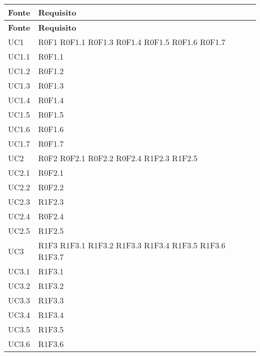 \def\arraystretch{1.5}
\begin{longtable}{p{2.5cm}!{\VRule[1pt]}p{2.5cm}}
\color{white} \textbf{Fonte} & \color{white} \textbf{Requisito} \\ 
\endfirsthead 
{} 
\color{white} \textbf{Fonte} & \color{white} \textbf{Requisito} \\ 
\endhead 
UC1 & R0F1 
	\newline R0F1.1
	\newline R0F1.3
	\newline R0F1.4
	\newline R0F1.5
	\newline R0F1.6
	\newline R0F1.7\\
UC1.1 & R0F1.1\\
UC1.2 & R0F1.2\\
UC1.3 & R0F1.3\\
UC1.4 & R0F1.4\\
UC1.5 & R0F1.5\\
UC1.6 & R0F1.6\\
UC1.7 & R0F1.7\\
UC2 & R0F2
	\newline R0F2.1
	\newline R0F2.2
	\newline R0F2.4
	\newline R1F2.3
	\newline R1F2.5\\
UC2.1 & R0F2.1\\
UC2.2 & R0F2.2\\
UC2.3 & R1F2.3\\
UC2.4 & R0F2.4\\
UC2.5 & R1F2.5\\
UC3 & R1F3
	\newline R1F3.1
	\newline R1F3.2
	\newline R1F3.3
	\newline R1F3.4
	\newline R1F3.5
	\newline R1F3.6
	\newline R1F3.7\\
UC3.1 & R1F3.1\\
UC3.2 & R1F3.2\\
UC3.3 & R1F3.3\\
UC3.4 & R1F3.4\\
UC3.5 & R1F3.5\\
UC3.6 & R1F3.6\\

\end{longtable}
